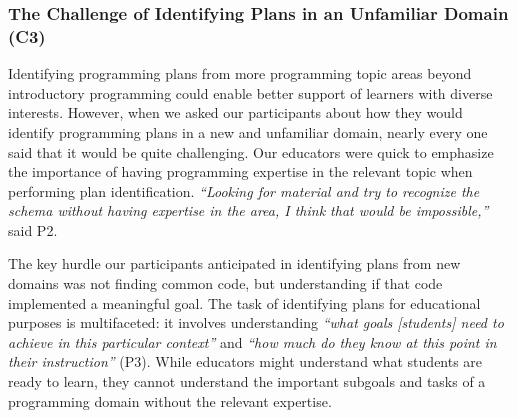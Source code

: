 


\subsubsection{The Challenge of Identifying Plans in an Unfamiliar Domain (C3)}
Identifying programming plans from more programming topic areas beyond introductory programming could enable better support of learners with diverse interests. However, when we asked our participants about how they would identify programming plans in a new and unfamiliar domain, nearly every one said that it would be quite challenging. Our educators were quick to emphasize the importance of having programming expertise in the relevant topic when performing plan identification.  \textit{``Looking for material and try to recognize the schema without having expertise in the area, I think that would be impossible,''} said P2.

The key hurdle our participants anticipated in identifying plans from new domains was not finding common code, but understanding if that code implemented a meaningful goal. The task of identifying plans for educational purposes is multifaceted: it involves understanding \textit{``what goals [students] need to achieve in this particular context''} and \textit{``how much do they know at this point in their instruction''} (P3). While educators might understand what students are ready to learn, they cannot understand the important subgoals and tasks of a programming domain without the relevant expertise.

